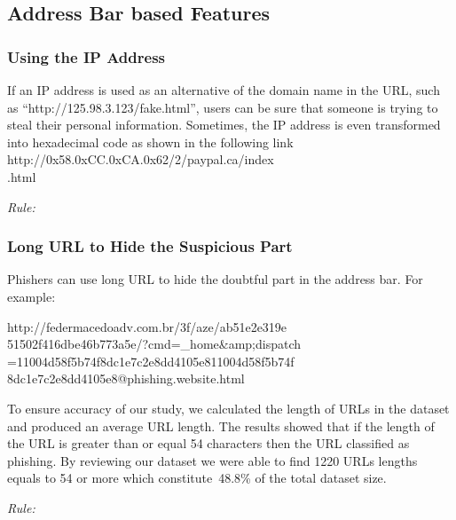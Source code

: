 \documentclass[twocolumn,10pt]{article}
\begin{document}
\subsection{Address Bar based Features}
\subsubsection{Using the IP Address}

If an IP address is used as an alternative of the domain name in the URL, such as “http://125.98.3.123/fake.html”, users can be sure that someone is trying to steal their personal information. Sometimes, the IP address is even transformed into hexadecimal code as shown in the following link http://0x58.0xCC.0xCA.0x62/2/paypal.ca/index\\.html

\begin{center}
\it Rule:
\end{center}

\subsubsection{Long URL to Hide the Suspicious Part}

Phishers can use long URL to hide the doubtful part in the address bar. For example:

http://federmacedoadv.com.br/3f/aze/ab51e2e319e\\51502f416dbe46b773a5e/?cmd=\_home\&amp;dispatch\\=11004d58f5b74f8dc1e7c2e8dd4105e811004d58f5b74f\\8dc1e7c2e8dd4105e8@phishing.website.html

To ensure accuracy of our study, we calculated the length of URLs in the dataset and produced an average URL length. The results showed that if the length of the URL is greater than or equal 54 characters then the URL classified as phishing. By reviewing our dataset we were able to find 1220 URLs lengths equals to 54 or more which constitute 48.8\% of the total dataset size.

\begin{center}
\it Rule:
\end{center}
\end{document}
